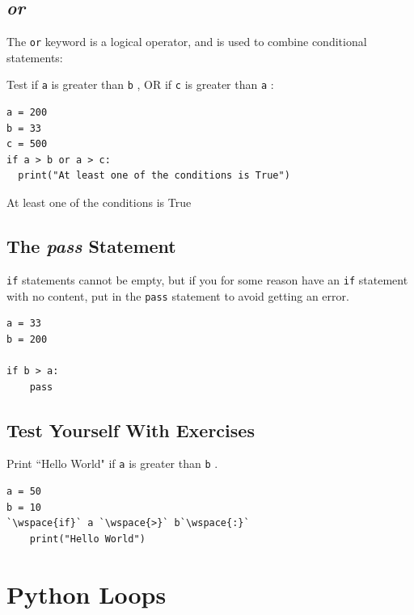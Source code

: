\documentclass[12pt,a4paper]{article}
\newcommand{\wspace}[1]{%
	\color{white}\colorbox{white}{\texttt{#1}}%
}
\newcommand{\code}[1]{%
	\colorbox{backcolour}{\lstinline{#1}}%
}
\newcommand{\lcode}[1]{%
	\lstinline{#1}%
}
\begin{document}
\subsection{\textit{or}}

The \code{or} keyword is a logical operator, and is used to combine conditional statements:

\begin{ebox}
Test if \lcode{a} is greater than \lcode{b}, OR if \lcode{c} is greater than
\lcode{a}:
	\begin{lstlisting}
a = 200
b = 33
c = 500
if a > b or a > c:
  print("At least one of the conditions is True")
	\end{lstlisting}
\tcblower
	\begin{vercode}
At least one of the conditions is True
	\end{vercode}
\end{ebox}
\subsection{The \textit{pass} Statement}

\code{if} statements cannot be empty, but if you for some reason have an
\code{if} statement with no content, put in the \code{pass} statement to avoid
getting an error.

\begin{ebox}
	\begin{lstlisting}
a = 33
b = 200

if b > a:
    pass
	\end{lstlisting}
\end{ebox}
\subsection{Test Yourself With Exercises}

\begin{tbox}
Print ``Hello World" if \code{a} is greater than \code{b}.
	\begin{lstlisting}[numbers=none]
a = 50
b = 10
`\wspace{if}` a `\wspace{>}` b`\wspace{:}`
    print("Hello World")
	\end{lstlisting}
\end{tbox}
\vfill\newpage
\section{Python Loops}
\end{document}
